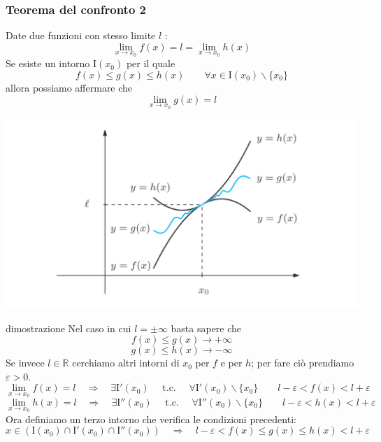 \documentclass[x11names]{article}
\begin{document}
	\begin{center}
		\colorbox{myred}{\begin{minipage}{5.75in}
				\begin{redes}{}
					\subsubsection{Teorema del confronto 2}
					Date due funzioni con stesso limite $l$ :
					\[
					\lim_{x \to x_0} f(x) = l = \lim_{x \to x_0} h(x)
					\]
					Se esiste un intorno $\text{I}(x_0)$ per il quale 
					\[
					f(x) \leq g(x) \leq h(x) \qquad  \forall x \in \text{I}(x_0) \backslash \{x_0\}
					\]
					allora possiamo affermare che 
					\[
					\lim_{x \to x_0} g(x) = l
					\]
				\end{redes}
		\end{minipage}}        
	\end{center}
	\begin{center}
		\includegraphics[scale=0.3]{figures/confronto2}
	\end{center}
	\begin{es}{dimostrazione}
		Nel caso in cui $l = \pm \infty$ basta sapere che
		\[
		f(x) \leq g(x) \to +\infty
		\]
		\[
		g(x) \leq h(x) \to -\infty
		\]
		Se invece $l \in \mathbb{R}$ cerchiamo altri intorni di $x_0$ per $f$ e per $h$; per fare ciò prendiamo $\varepsilon > 0$.
		\[
		\lim_{x \to x_0} f(x) = l \quad \Longrightarrow \quad \exists \text{I}'(x_0) \quad \text{ t.c. } \quad \forall \text{I}'(x_0) \backslash \{x_0\} \qquad l - \varepsilon < f(x) < l + \varepsilon
		\]
		\[
		\lim_{x \to x_0} h(x) = l \quad \Longrightarrow \quad \exists \text{I}''(x_0) \quad \text{ t.c. } \quad \forall \text{I}''(x_0) \backslash \{x_0\} \qquad l - \varepsilon < h(x) < l + \varepsilon
		\]
		Ora definiamo un terzo intorno che verifica le condizioni precedenti:
		\[
		x \in (\text{I}(x_0) \cap \text{I}'(x_0) \cap \text{I}''(x_0)) \quad \Longrightarrow \quad l - \varepsilon < f(x)\leq g(x) \leq h(x) < l + \varepsilon
		\]
	\end{es}
\end{document}
